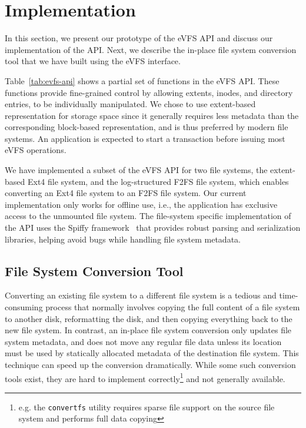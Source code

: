\vspace{-0.5em}
\section{Implementation\label{sec:Implementation}}

In this section, we present our prototype of the eVFS API and discuss our implementation of the API. Next, we describe the in-place file system conversion tool that we have built using the eVFS interface.

Table~\ref{tab:evfs-api} shows a partial set of functions in the eVFS API. These functions provide fine-grained control by allowing extents, inodes, and directory entries, to be individually manipulated. We chose to use extent-based representation for storage space since it generally requires less metadata than the corresponding block-based representation, and is thus preferred by modern file systems. An application is expected to start a transaction before issuing most eVFS operations. 


We have implemented a subset of the eVFS API for two file systems, the extent-based Ext4 file system, and the log-structured F2FS file system, which enables converting an Ext4 file system to an F2FS file system. Our current implementation only works for offline use, i.e., the application has exclusive access to the unmounted file system. The file-system specific implementation of the API uses the Spiffy framework~\cite{sun2018spiffy} that provides robust parsing and serialization libraries, helping avoid bugs while handling file system metadata.

\vspace{-0.5em}
\subsection{File System Conversion Tool\label{subsec:conversion_tool}}

Converting an existing file system to a different file system is a tedious and time-consuming process that normally involves copying the full content of a file system to another disk, reformatting the disk, and then copying everything back to the new file system. In contrast, an in-place file system conversion only updates file system metadata, and does not move any regular file data unless its location must be used by statically allocated metadata of the destination file system. This technique can speed up the conversion dramatically. While some such conversion tools exist, they are hard to implement correctly\footnote{e.g. the \texttt{convertfs} utility \cite{convertfs} requires sparse file support on the source file system and performs full data copying} and not generally available.

